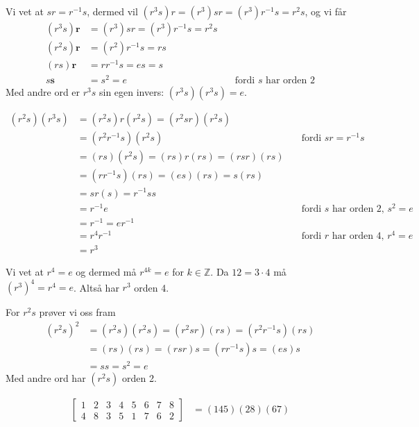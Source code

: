 \documentclass[a4paper,norsk,12pt]{article}
\begin{document}
Vi vet at $sr=r^{-1}s$, dermed vil $(r^3s)r = (r^3)sr = (r^3)r^{-1}s = r^2s$,
og vi får
\begin{align*}
  (r^3s)\mathbf{r} &= (r^3)sr = (r^3)r^{-1}s = r^2s \\
  (r^2s)\mathbf{r} &= (r^2)r^{-1}s = rs \\
  (rs)\mathbf{r} &= rr^{-1}s = es = s \\
  s\mathbf{s} &= s^2 = e & \quad\text{fordi $s$ har orden 2}
\end{align*}
Med andre ord er $r^3s$ sin egen invers: $(r^3s)(r^3s) = e$.

\begin{align*}
  (r^2s)(r^3s) &= (r^2s)r(r^2s) = (r^2sr)(r^2s) \\
               &= (r^2r^{-1}s)(r^2s)  & \quad\text{fordi } sr=r^{-1}s \\
               &= (rs)(r^2s) = (rs)r(rs) = (rsr)(rs) \\
               &= (rr^{-1}s)(rs) = (es)(rs) = s(rs) \\
               &= sr(s) = r^{-1}ss \\
               &= r^{-1}e & \quad\text{fordi $s$ har orden 2, } s^2=e \\
               &= r^{-1} = er^{-1} \\
               &= r^4r^{-1} & \quad\text{fordi $r$ har orden 4, } r^4=e \\
               &= r^3
\end{align*}

Vi vet at $r^4=e$ og dermed må $r^{4k}=e$ for $k\in\mathbb{Z}$. Da $12 = 3\cdot4$ må
$(r^3)^4=r^4=e$. Altså har $r^3$ orden 4.

For $r^2s$ prøver vi oss fram
\begin{align*}
  (r^2s)^2 &= (r^2s)(r^2s) = (r^2sr)(rs) = (r^2r^{-1}s)(rs) \\
           &= (rs)(rs) = (rsr)s = (rr^{-1}s)s = (es)s \\
           &= ss = s^2 = e
\end{align*}
Med andre ord har $(r^2s)$ orden 2.

\begin{align*}
  \left[\begin{matrix}
      1 & 2 & 3 & 4 & 5 & 6 & 7 & 8 \\
      4 & 8 & 3 & 5 & 1 & 7 & 6 & 2
  \end{matrix}\right] &=
  (145)(28)(67)
\end{align*}
\end{document}

